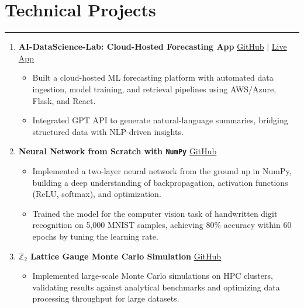 \documentclass[11pt]{article}
\begin{document}
\section*{Technical Projects}
\hrule
\vspace{-0.3em}
\begin{enumerate}
    \item \textbf{AI-DataScience-Lab: Cloud-Hosted Forecasting App}  
    \hfill \href{https://github.com/Hariprashad-Ravikumar/AI-DataScience-Lab}{GitHub} $|$ \href{https://hariprashad-ravikumar.github.io/AI-DataScience-Lab}{Live App} \\
    \vspace{-2em}
    \begin{itemize}
    \item Built a cloud-hosted ML forecasting platform with automated data ingestion, model training, and retrieval pipelines using AWS/Azure, Flask, and React.
    \vspace{-0.5em}
    \item Integrated GPT API to generate natural-language summaries, bridging structured data with NLP-driven insights.
    \end{itemize}
    

    \item \textbf{Neural Network from Scratch with \texttt{NumPy}}  
    \hfill \href{https://github.com/Hariprashad-Ravikumar/Neural-Network-from-Scratch-with-NumPy}{GitHub} \\
    \vspace{-2em}
    \begin{itemize}
        \item Implemented a two-layer neural network from the ground up in NumPy, building a deep understanding of backpropagation, activation functions (ReLU, softmax), and optimization.
        \vspace{-0.5em}
        \item Trained the model for the computer vision task of handwritten digit recognition on 5,000 MNIST samples, achieving $80\%$ accuracy within 60 epochs by tuning the learning rate.
    \end{itemize}

    \item \textbf{$\mathbb{Z}_2$ Lattice Gauge Monte Carlo Simulation}  
    \hfill \href{https://github.com/Hariprashad-Ravikumar/Z2_LatticeGauge_Monte_Carlo_Simulation}{GitHub} \\
    \vspace{-2em}
    \begin{itemize}
         \item Implemented large-scale Monte Carlo simulations on HPC clusters, validating results against analytical benchmarks and optimizing data processing throughput for large datasets.
    \end{itemize}
\end{enumerate}
\end{document}
